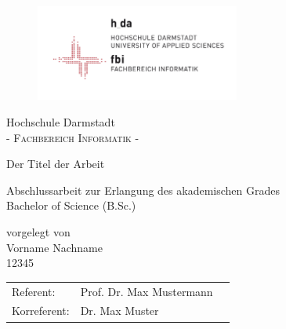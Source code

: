 \pagestyle{empty} %

\begin{figure}[t]
	\centering
	\includegraphics[width=0.6\textwidth]{Abb/logo_fbi}
\end{figure}


\begin{center}
\Large Hochschule Darmstadt \\
\normalsize \textsc{- Fachbereich Informatik -} \\

\vspace{105 pt}

\Huge Der Titel der Arbeit \\ 
\normalsize
\vspace{20 pt}

Abschlussarbeit zur Erlangung des akademischen Grades \\ 
Bachelor of Science (B.Sc.) 

\vspace{75 pt}


vorgelegt von \\
\vspace{5 pt}
Vorname Nachname \\
12345
\vspace{115 pt}

\begin{tabular}[h]{p{4cm}l l}
	Referent: & Prof. Dr. Max Mustermann\\
	Korreferent: & Dr. Max Muster
\end{tabular}


\end{center}
